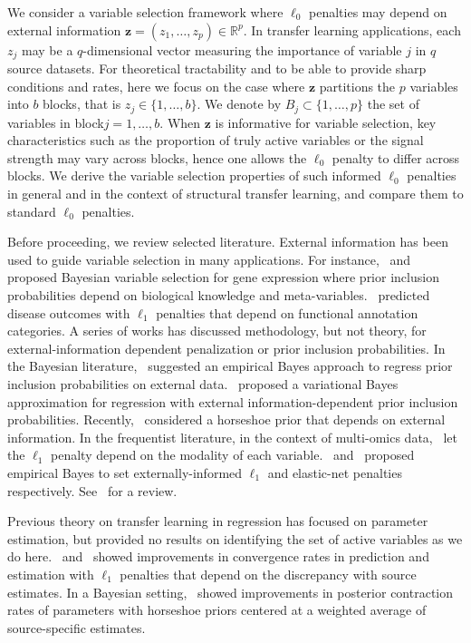 \documentclass[
  12pt]{article}
\newcommand{\R}{\mathbb{R}}
\newcommand{\bz}{\boldsymbol{z}}
\begin{document}
We consider a variable selection framework where $\ell_0$ penalties may depend on external information $\bz=(z_1,\ldots,z_p) \in \R^p$. In transfer learning applications, each $z_j$ may be a $q$-dimensional vector measuring the importance of variable $j$ in $q$ source datasets. For theoretical tractability and to be able to provide sharp conditions and rates, here we focus on the case where $\bz$ partitions the $p$ variables into $b$ blocks, that is $z_j \in \{1,\ldots,b\}$.
We denote by $B_j \subset \{1,\ldots,p\}$ the set of variables in block$j=1,\ldots,b$.
When $\bz$ is informative for variable selection, key characteristics such as the proportion of truly active variables or the signal strength may vary across blocks, hence one allows the $\ell_0$ penalty to differ across blocks. 
We derive the variable selection properties of such informed $\ell_0$ penalties in general and in the context of structural transfer learning, and compare them to standard $\ell_0$ penalties.

Before proceeding, we review selected literature.
External information has been used to guide variable selection in many applications. For instance,~\cite{stingo:2011} and~\cite{cassese:2014} proposed Bayesian variable selection for gene expression where prior inclusion probabilities depend on biological knowledge and meta-variables.~\cite{chen_tinghuei:2021} predicted disease outcomes with $\ell_1$ penalties that depend on functional annotation categories. A series of works has discussed methodology, but not theory, for external-information dependent penalization or prior inclusion probabilities. In the Bayesian literature,~\cite{vandeWiel2019} suggested an empirical Bayes approach to regress prior inclusion probabilities on external data.~\cite{Velten2021} proposed a variational Bayes approximation for regression with external information-dependent prior inclusion probabilities. Recently,~\cite{busatto2023} considered a horseshoe prior that depends on external information. In the frequentist literature, in the context of multi-omics data,~\cite{Boulesteix2017} let the $\ell_1$ penalty depend on the modality of each variable.~\cite{Zeng2020} and~\cite{vanNee2023} proposed empirical Bayes to set externally-informed $\ell_1$ and elastic-net penalties respectively. See~\cite{vandewiel2024} for a review.

Previous theory on transfer learning in  regression has focused on parameter estimation, but provided no results on identifying the set of active variables as we do here.~\cite{Jiang2016} and~\cite{Li2021} showed improvements in convergence rates in prediction and estimation with $\ell_1$ penalties that depend on the discrepancy with source estimates. In a Bayesian setting,~\cite{lai2024} showed improvements in posterior contraction rates of parameters with horseshoe priors centered at a weighted average of source-specific estimates.
\end{document}
